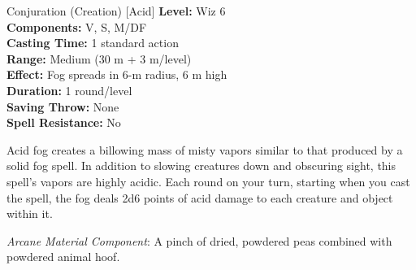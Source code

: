{Conjuration (Creation) [Acid]}
{
	\textbf{Level:}
	Wiz 6\\
	\textbf{Components:}
	V, S, M/DF\\
	\textbf{Casting Time:}
	1 standard action\\
	\textbf{Range:}
	Medium (30 m + 3 m/level)\\
	\textbf{Effect:}
	Fog spreads in 6-m radius, 6 m high\\
	\textbf{Duration:}
	1 round/level\\
	\textbf{Saving Throw:}
	None\\
	\textbf{Spell Resistance:}
	No\\
}
{
Acid fog creates a billowing mass of misty vapors similar to that produced by a solid fog spell. In addition to slowing creatures down and obscuring sight, this spell's vapors are highly acidic. Each round on your turn, starting when you cast the spell, the fog deals 2d6 points of acid damage to each creature and object within it.

	\textit{Arcane Material Component}:
	A pinch of dried, powdered peas combined with powdered animal hoof.

}
